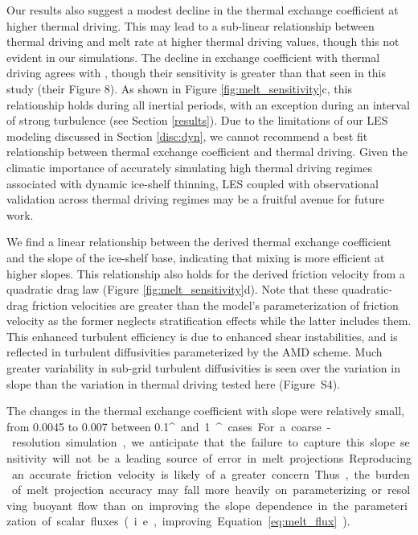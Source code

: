 \documentclass[tc, manuscript]{copernicus}
\begin{document}
Our results also suggest a modest decline in the thermal exchange coefficient at higher thermal driving. This may lead to a sub-linear relationship between thermal driving and melt rate at higher thermal driving values, though this not evident in our simulations. The decline in exchange coefficient with thermal driving agrees with \citet{vreugdenhil_stratification_2019}, though their sensitivity is greater than that seen in this study (their Figure 8). As shown in Figure \ref{fig:melt_sensitivity}c, this relationship holds during all inertial periods, with an exception during an interval of strong turbulence (see Section \ref{results}). Due to the limitations of our LES modeling discussed in Section \ref{disc:dyn}, we cannot recommend a best fit relationship between thermal exchange coefficient and thermal driving. Given the climatic importance of accurately simulating high thermal driving regimes associated with dynamic ice-shelf thinning, LES coupled with observational validation across thermal driving regimes may be a fruitful avenue for future work.

We find a linear relationship between the derived thermal exchange coefficient and the slope of the ice-shelf base, indicating that mixing is more efficient at higher slopes. This relationship also holds for the derived friction velocity from a quadratic drag law (Figure \ref{fig:melt_sensitivity}d). Note that these quadratic-drag friction velocities are greater than the model's parameterization of friction velocity as the former neglects stratification effects while the latter includes them. This enhanced turbulent efficiency is due to enhanced shear instabilities, and is reflected in turbulent diffusivities parameterized by the AMD scheme. Much greater variability in sub-grid turbulent diffusivities is seen over the variation in slope than the variation in thermal driving tested here (Figure~S4). 

The changes in the thermal exchange coefficient with slope were relatively small, from 0.0045 to 0.007 between 0.1\unit{^{\circ}} and 1\unit{^{\circ}} cases. For a coarse-resolution simulation, we anticipate that the failure to capture this slope sensitivity will not be a leading source of error in melt projections. Reproducing an accurate friction velocity is likely of a greater concern. Thus, the burden of melt projection accuracy may fall more heavily on parameterizing or resolving buoyant flow than on improving the slope dependence in the parameterization of scalar fluxes (i.e., improving Equation~\ref{eq:melt_flux}). 
\end{document}
